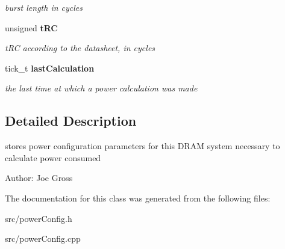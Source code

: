 \begin{CompactItemize}
\begin{CompactList}\small\item\em burst length in cycles \item\end{CompactList}\item 
unsigned {\bf tRC}\label{class_d_r_a_m_sim_i_i_1_1power_config_83cf733c89b32de09bceb01b2e9a9bc7}

\begin{CompactList}\small\item\em tRC according to the datasheet, in cycles \item\end{CompactList}\item 
tick\_\-t {\bf lastCalculation}\label{class_d_r_a_m_sim_i_i_1_1power_config_33f90476523ec72691f1cb01b1aeb825}

\begin{CompactList}\small\item\em the last time at which a power calculation was made \item\end{CompactList}\end{CompactItemize}


\subsection{Detailed Description}
stores power configuration parameters for this DRAM system necessary to calculate power consumed 

\begin{Desc}
\item[Author:]Joe Gross \end{Desc}


The documentation for this class was generated from the following files:\begin{CompactItemize}
\item 
src/powerConfig.h\item 
src/powerConfig.cpp\end{CompactItemize}
